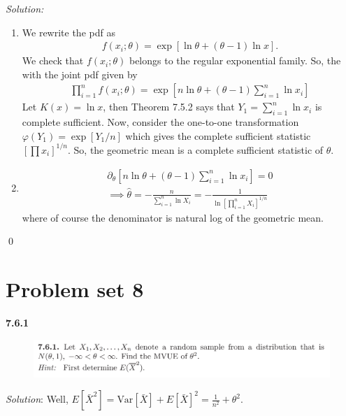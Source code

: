 \documentclass{book}
\theoremstyle{definition}
\newcommand{\p}{\partial}
\newcommand{\nn}{\nonumber}
\newcommand{\Var}{\text{Var}}
\newcommand{\f}[2]{\frac{#1}{#2}}
\newcommand{\lb}{\left[}
\newcommand{\rb}{\right]}
\begin{document}
\noindent \textit{Solution:}  

\begin{enumerate}
	\item We rewrite the pdf as
	\begin{align}
	f(x_i;\theta) = \exp\lb \ln \theta + (\theta - 1)\ln x \rb.
	\end{align}
	We check that $f(x_i;\theta)$ belongs to the regular exponential family. So, the with the joint pdf given by
	\begin{align}
	\prod^n_{i=1}f(x_i;\theta) = \exp\lb n\ln \theta + (\theta-1)\sum^n_{i=1}\ln x_i \rb
	\end{align}
	Let $K(x)  = \ln x$, then Theorem 7.5.2 says that $Y_1 = \sum^n_{i=1}\ln x_i$ is complete sufficient. Now, consider the one-to-one transformation $\varphi(Y_1) = \exp\lb Y_1/n \rb $ which gives the complete sufficient statistic $\lb \prod x_i\rb^{1/n}$. So, the geometric mean is a complete sufficient statistic of $\theta$. 
	
	\item 
	\begin{align}
	\p_\theta \lb n\ln \theta + (\theta-1)\sum^n_{i=1}\ln x_i \rb = 0\nn\\
	\implies \hat\theta = -\f{n}{\sum^n_{i=1}\ln X_i} = -\f{1}{\ln \lb\prod^n_{i=1}X_i\rb^{1/n}}
	\end{align}
	where of course the denominator is natural log of the geometric mean. 
\end{enumerate}\qed



\newpage






\section{Problem set 8}

\noindent\textbf{7.6.1}
\begin{figure}[!htb]
	\centering
	\includegraphics[scale=0.5]{761}
\end{figure}

\noindent\textit{Solution}: Well, $E[\bar{X}^2] = \Var[\bar{X}] + E[\bar{X}]^2 = \f{1}{n^2} + \theta^2$.
\end{document}
